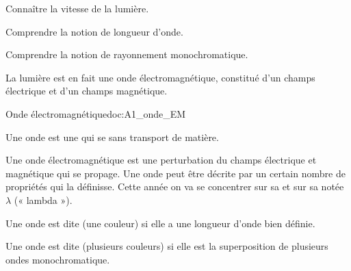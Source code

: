 \teteSndLumi

\vspace*{-30pt}


\begin{objectifs}
  \item Connaître la vitesse de la lumière.
  \item Comprendre la notion de longueur d'onde.
  \item Comprendre la notion de rayonnement monochromatique.
\end{objectifs}

\begin{contexte}
  La lumière est en fait une onde électromagnétique, constitué d'un champs électrique et d'un champs magnétique.
  
\end{contexte}


\begin{doc}{Onde électromagnétique}{doc:A1_onde_EM}
  \begin{importants}
    Une onde est une  qui se  sans transport de matière.
  \end{importants}
  
  Une onde électromagnétique est une perturbation du champs électrique et magnétique qui se propage.
  Une onde peut être décrite par un certain nombre de propriétés qui la définisse.
  Cette année on va se concentrer sur sa  et sur sa  notée $\lambda$ (« lambda »).
  
  \begin{importants}
    Une onde est dite  (une couleur) si elle a une longueur d'onde bien définie.
    
    Une onde est dite  (plusieurs couleurs) si elle est la superposition de plusieurs ondes monochromatique.
  \end{importants}
\end{doc}



